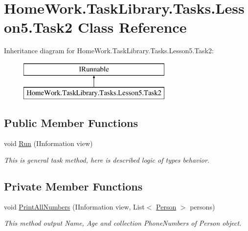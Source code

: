 \hypertarget{class_home_work_1_1_task_library_1_1_tasks_1_1_lesson5_1_1_task2}{}\section{Home\+Work.\+Task\+Library.\+Tasks.\+Lesson5.\+Task2 Class Reference}
\label{class_home_work_1_1_task_library_1_1_tasks_1_1_lesson5_1_1_task2}
Inheritance diagram for Home\+Work.\+Task\+Library.\+Tasks.\+Lesson5.\+Task2\+:\begin{figure}[H]
\begin{center}
\leavevmode
\includegraphics[height=2.000000cm]{class_home_work_1_1_task_library_1_1_tasks_1_1_lesson5_1_1_task2}
\end{center}
\end{figure}
\subsection*{Public Member Functions}
\begin{DoxyCompactItemize}
\item 
void \mbox{\hyperlink{class_home_work_1_1_task_library_1_1_tasks_1_1_lesson5_1_1_task2_a6f882c39e297740775a0e5ccecc51f8b}{Run}} (I\+Information view)
\begin{DoxyCompactList}\small\item\em This is general task method, here is described logic of types behavior. \end{DoxyCompactList}\end{DoxyCompactItemize}
\subsection*{Private Member Functions}
\begin{DoxyCompactItemize}
\item 
void \mbox{\hyperlink{class_home_work_1_1_task_library_1_1_tasks_1_1_lesson5_1_1_task2_ae44de76c02373304b0e2781726497adb}{Print\+All\+Numbers}} (I\+Information view, List$<$ \mbox{\hyperlink{class_home_work_1_1_task_library_1_1_tasks_1_1_lesson5_1_1_classes_1_1_person}{Person}} $>$ persons)
\begin{DoxyCompactList}\small\item\em This method output Name, Age and collection Phone\+Numbers of Person object. \end{DoxyCompactList}\end{DoxyCompactItemize}


